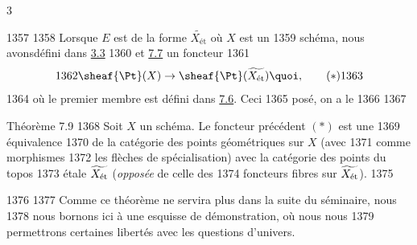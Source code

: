3	\documentclass[10pt]{../fichiers-configuration-latex/smfart}
\begin{document}
  1357	
  1358	Lorsque $E$ est de la forme $\widetilde{X_{\text{ét}}}$ où $X$ est un
  1359	schéma, nous avons\pageoriginale défini dans \hyperref[VIII.def3.3]{3.3}
  1360	et \hyperref[VIII.subsec7.7]{7.7} un foncteur
  1361	\begin{equation*}
  1362	\sheaf{\Pt} (X) \to \sheaf{\Pt} (\widetilde{X_{\text{ét}}}){\quoi},\tag{$\ast$}
  1363	\end{equation*}
  1364	où le premier membre est défini dans \hyperref[VIII.cor7.6]{7.6}. Ceci
  1365	posé, on a le
  1366	
  1367	\begin{enonce*}{Théorème 7.9}
  1368	Soit $X$ un schéma. Le foncteur précédent $(\ast)$ est une
  1369	équivalence
  1370	de la catégorie des points géométriques sur $X$ (avec
  1371	comme morphismes
  1372	les flèches de spécialisation) avec la catégorie des points du topos
  1373	étale $\widetilde{X_{\text{\rm ét}}}$ (\emph{opposée} de celle des
  1374	foncteurs fibres sur $\widetilde{X_{\text{\rm ét}}}$).
  1375	\end{enonce*}
  1376	
  1377	Comme ce théorème ne servira plus dans la suite du séminaire, nous
  1378	nous bornons ici à une esquisse de démonstration, où nous nous
  1379	permettrons certaines libertés avec les questions d'univers.
\end{document}
